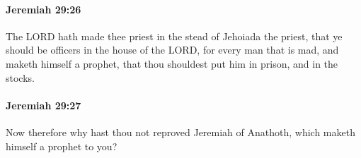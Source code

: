 		\paragraph{Jeremiah 29:26} %
			\label{JEREMIAH-29-26}

			The LORD hath made thee priest in the stead of Jehoiada the priest, that ye should be officers in the house of the LORD, for every man that is mad, and maketh himself a prophet, that thou shouldest put him in prison, and in the stocks.


		\paragraph{Jeremiah 29:27} %
			\label{JEREMIAH-29-27}

			Now therefore why hast thou not reproved Jeremiah of Anathoth, which maketh himself a prophet to you?


